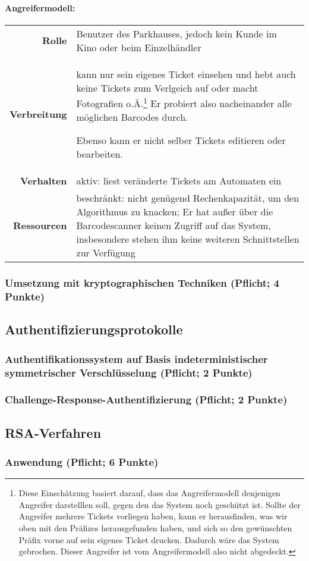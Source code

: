 \documentclass{article}
\begin{document}
\paragraph{Angreifermodell:}
\begin{center}
	\begin{savenotes}	%
		\begin{tabular}{rp{}}
			\textbf{Rolle}			&	Benutzer des Parkhauses, jedoch kein Kunde im Kino oder beim Einzelhändler	\\
			\textbf{Verbreitung}	&	kann nur sein eigenes Ticket einsehen und hebt auch keine Tickets zum Verlgeich auf oder macht Fotografien o.Ä.\footnote{
											Diese Einschätzung basiert darauf, dass das Angreifermodell denjenigen Angreifer darstelllen soll, gegen den das System noch geschützt ist.
											Sollte der Angreifer mehrere Tickets vorliegen haben, kann er herausfinden, was wir oben mit den Präfizes herausgefunden haben, und sich so den gewünschten Präfix vorne auf sein eigenes Ticket drucken.
											Dadurch wäre das System gebrochen.
											Dieser Angreifer ist vom Angreifermodell also nicht abgedeckt.
										}
										Er probiert also nacheinander alle möglichen Barcodes durch.
										
										Ebenso kann er nicht selber Tickets editieren oder bearbeiten.	\\
			\textbf{Verhalten}		&	aktiv: liest veränderte Tickets am Automaten ein	\\
			\textbf{Ressourcen}		&	beschränkt: nicht genügend Rechenkapazität, um den Algorithmus zu knacken;
										Er hat außer über die Barcodescanner keinen Zugriff auf das System, insbesondere stehen ihm keine weiteren Schnittstellen zur Verfügung
		\end{tabular}
	\end{savenotes}
\end{center}
\subsubsection{Umsetzung mit kryptographischen Techniken (Pflicht; 4 Punkte)}


\subsection{Authentifizierungsprotokolle}
\subsubsection{Authentifikationssystem auf Basis indeterministischer symmetrischer Verschlüsselung (Pflicht; 2 Punkte)}
\subsubsection{Challenge-Response-Authentifizierung (Pflicht; 2 Punkte) }


\subsection{RSA-Verfahren}
\subsubsection{Anwendung (Pflicht; 6 Punkte)}
\end{document}
